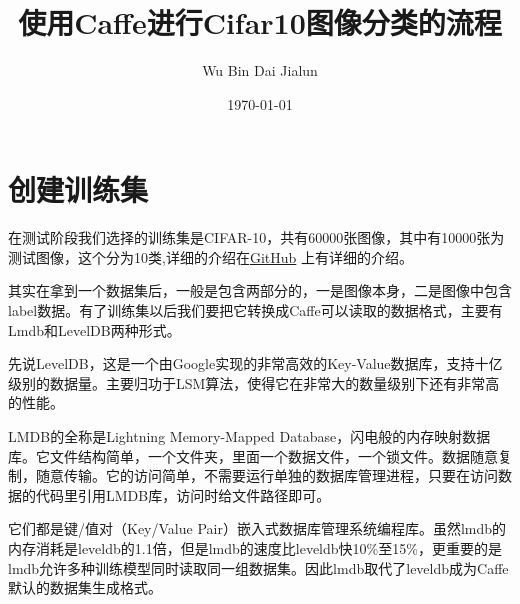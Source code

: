 

\title{\vspace{-2em} 使用Caffe进行Cifar10图像分类的流程\\
\normalsize{}}
\author{Wu Bin \hspace{0.25in} Dai Jialun}
\date{\vspace{-0.7em} \today \vspace{-0.7em}}
\maketitle\thispagestyle{fancy}
\maketitle
\section{创建训练集}
在测试阶段我们选择的训练集是CIFAR-10，共有60000张图像，其中有10000张为测试图像，这个分为10类,详细的介绍在\href{https://github.com/daijialun/ZooplanktonClassification\_DL/tree/master/Cifar10\_MNIST}{GitHub} 上有详细的介绍。

其实在拿到一个数据集后，一般是包含两部分的，一是图像本身，二是图像中包含label数据。有了训练集以后我们要把它转换成Caffe可以读取的数据格式，主要有Lmdb和LevelDB两种形式。

先说LevelDB，这是一个由Google实现的非常高效的Key-Value数据库，支持十亿级别的数据量。主要归功于LSM算法，使得它在非常大的数量级别下还有非常高的性能。

LMDB的全称是Lightning Memory-Mapped Database，闪电般的内存映射数据库。它文件结构简单，一个文件夹，里面一个数据文件，一个锁文件。数据随意复制，随意传输。它的访问简单，不需要运行单独的数据库管理进程，只要在访问数据的代码里引用LMDB库，访问时给文件路径即可。

它们都是键/值对（Key/Value Pair）嵌入式数据库管理系统编程库。虽然lmdb的内存消耗是leveldb的1.1倍，但是lmdb的速度比leveldb快10\%至15\%，更重要的是lmdb允许多种训练模型同时读取同一组数据集。因此lmdb取代了leveldb成为Caffe默认的数据集生成格式。

